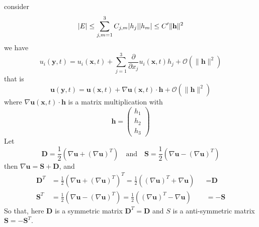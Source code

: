 consider
\begin{equation}
\abs{E} \leq \sum_{j,m=1}^{3} C_{j,m}\abs{h_j}\abs{h_m}\leq C'\lVert \textbf{h}\rVert^2
\end{equation}
we have
\begin{equation}
u_i(\textbf{y},t) = u_i(\textbf{x},t) + \sum_{j=1}^{3}\frac{\partial}{\partial x_j}u_{i}(\textbf{x},t)h_j + \mathcal{O}(\lVert \textbf{h}\rVert^2)
\end{equation}
that is 
\begin{equation}
\textbf{u}(\textbf{y},t) = \textbf{u}(\textbf{x},t) + \nabla \textbf{u}(\textbf{x},t)\cdot \textbf{h} + \mathcal{O}(\lVert \textbf{h}\rVert^2)
\label{eq: u expand }
\end{equation}
where $\nabla \textbf{u}(\textbf{x},t)\cdot \textbf{h}$ is a matrix multiplication with 
\begin{equation}
\textbf{h} = \begin{pmatrix}h_1\\h_2\\h_3\end{pmatrix}
\end{equation}
Let 
\begin{equation}
\textbf{D} = \frac{1}{2}\left(\nabla \textbf{u}+(\nabla\textbf{u})^T\right)
\quad\text{and}\quad
\textbf{S} = \frac{1}{2}\left(\nabla \textbf{u}-(\nabla\textbf{u})^T\right)
\end{equation}
then $\nabla \textbf{u} = \textbf{S} + \textbf{D}$, and
\begin{equation}
\begin{aligned}
\textbf{D}^T &= \frac{1}{2}\left(\nabla \textbf{u}+(\nabla\textbf{u})^T\right)^T
= \frac{1}{2}\left((\nabla \textbf{u})^T+\nabla\textbf{u}\right) &&= \textbf{D}
\\[6pt]
\textbf{S}^T &= \frac{1}{2}\left(\nabla \textbf{u}-(\nabla\textbf{u})^T\right)
=\frac{1}{2}\left((\nabla \textbf{u})^T-\nabla\textbf{u}\right) &&=  -\textbf{S}
\end{aligned}
\end{equation}
So that, here $\textbf{D}$ is a symmetric matrix $\textbf{D}^{T}=\textbf{D}$ and $S$ is a anti-symmetric matrix $\textbf{S}=-\textbf{S}^{T}$. 

